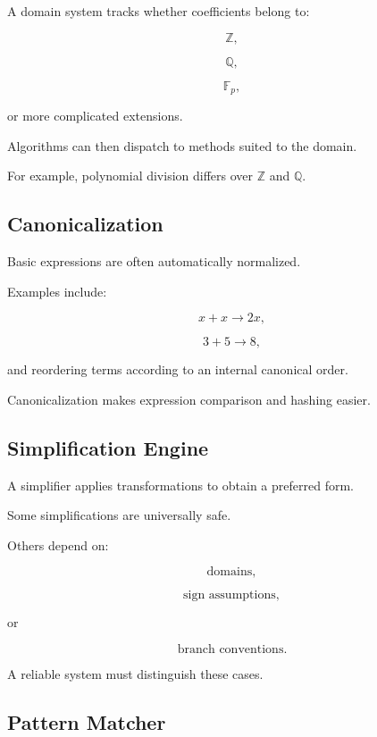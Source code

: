A domain system tracks whether coefficients belong to:

\[
\boxed{
\mathbb{Z},
}
\]

\[
\boxed{
\mathbb{Q},
}
\]

\[
\boxed{
\mathbb{F}_p,
}
\]

or more complicated extensions.

Algorithms can then dispatch to methods suited to the domain.

For example, polynomial division differs over \(\mathbb{Z}\) and
\(\mathbb{Q}\).

\subsection{Canonicalization}
\label{subsec:cas-canonicalization}

Basic expressions are often automatically normalized.

Examples include:

\[
x+x
\longrightarrow
2x,
\]

\[
3+5
\longrightarrow
8,
\]

and reordering terms according to an internal canonical order.

Canonicalization makes expression comparison and hashing easier.

\subsection{Simplification Engine}
\label{subsec:cas-simplification-engine}

A simplifier applies transformations to obtain a preferred form.

Some simplifications are universally safe.

Others depend on:

\[
\boxed{
\text{domains},
}
\]

\[
\boxed{
\text{sign assumptions},
}
\]

or

\[
\boxed{
\text{branch conventions}.
}
\]

A reliable system must distinguish these cases.

\subsection{Pattern Matcher}
\label{subsec:cas-pattern-matcher}

